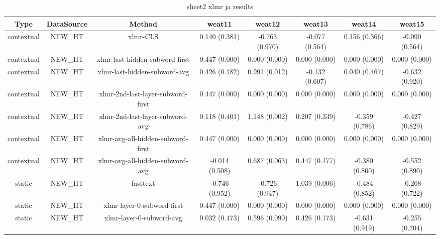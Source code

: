 \begin{sidewaystable}[htb]
    \centering
    \caption{sheet2 xlmr ja results}
    \label{appendix_tab:sheet2_xlmr_ja_results}
    \small
    \begin{tabular}{@{}cccccccc@{}}
        \toprule
        Type & DataSource & Method & weat11 & weat12 & weat13 & weat14 & weat15 \\
        \midrule
        contextual & NEW\_HT & xlmr-CLS & 0.140 (0.381) & -0.763 (0.970) & -0.077 (0.564) & 0.156 (0.366) & -0.090 (0.564) \\
        contextual & NEW\_HT & xlmr-last-hidden-subword-first & 0.447 (0.000) & 0.000 (0.000) & 0.000 (0.000) & 0.000 (0.000) & 0.000 (0.000) \\
        contextual & NEW\_HT & xlmr-last-hidden-subword-avg & 0.426 (0.182) & 0.991 (0.012) & -0.132 (0.607) & 0.040 (0.467) & -0.632 (0.920) \\
        contextual & NEW\_HT & xlmr-2nd-last-layer-subword-first & 0.447 (0.000) & 0.000 (0.000) & 0.000 (0.000) & 0.000 (0.000) & 0.000 (0.000) \\
        contextual & NEW\_HT & xlmr-2nd-last-layer-subword-avg & 0.118 (0.401) & 1.148 (0.002) & 0.207 (0.339) & -0.359 (0.786) & -0.427 (0.829) \\
        contextual & NEW\_HT & xlmr-avg-all-hidden-subword-first & 0.447 (0.000) & 0.000 (0.000) & 0.000 (0.000) & 0.000 (0.000) & 0.000 (0.000) \\
        contextual & NEW\_HT & xlmr-avg-all-hidden-subword-avg & -0.014 (0.508) & 0.687 (0.063) & 0.447 (0.177) & -0.380 (0.800) & -0.552 (0.890) \\
        static & NEW\_HT & fasttext & -0.746 (0.952) & -0.726 (0.947) & 1.039 (0.006) & -0.484 (0.852) & -0.268 (0.722) \\
        static & NEW\_HT & xlmr-layer-0-subword-first & 0.447 (0.000) & 0.000 (0.000) & 0.000 (0.000) & 0.000 (0.000) & 0.000 (0.000) \\
        static & NEW\_HT & xlmr-layer-0-subword-avg & 0.032 (0.473) & 0.596 (0.090) & 0.426 (0.173) & -0.631 (0.919) & -0.255 (0.704) \\
        \bottomrule
    \end{tabular}
\end{sidewaystable}